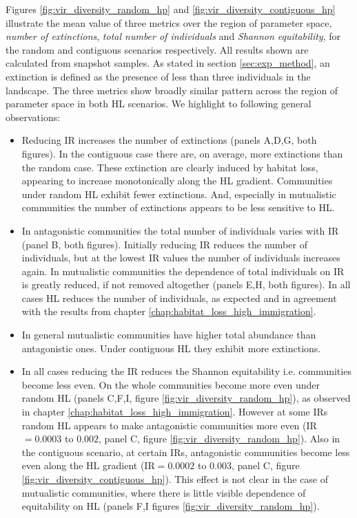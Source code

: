 Figures \ref{fig:vir_diversity_random_hp} and \ref{fig:vir_diversity_contiguous_hp} illustrate the mean value of three metrics over the region of parameter space, \emph{number of extinctions}, \emph{total number of individuals} and \emph{Shannon equitability}, for the random and contiguous scenarios respectively. All results shown are calculated from snapshot samples. As stated in section \ref{sec:exp_method}, an extinction is defined as the presence of less than three individuals in the landscape. The three metrics show broadly similar pattern across the region of parameter space in both HL scenarios. We highlight to following general observations:
\begin{itemize}
	\item Reducing IR increases the number of extinctions (panels A,D,G, both figures). In the contiguous case there are, on average, more extinctions than the random case. These extinction are clearly induced by habitat loss, appearing to increase monotonically along the HL gradient. Communities under random HL exhibit fewer extinctions. And, especially in mutualistic communities the number of extinctions appears to be less sensitive to HL.
	\item In antagonistic communities the total number of individuals varies with IR (panel B, both figures). Initially reducing IR reduces the number of individuals, but at the lowest IR values the number of individuals increases again. In mutualistic communities the dependence of total individuals on IR is greatly reduced, if not removed altogether (panels E,H, both figures). In all cases HL reduces the number of individuals, as expected and in agreement with the results from chapter \ref{chap:habitat_loss_high_immigration}.
	\item In general mutualistic communities have higher total abundance than antagonistic ones. Under contiguous HL they exhibit more extinctions.
	\item In all cases reducing the IR reduces the Shannon equitability i.e. communities become less even. On the whole communities become more even under random HL (panels C,F,I, figure \ref{fig:vir_diversity_random_hp}), as observed in chapter \ref{chap:habitat_loss_high_immigration}. However at some IRs random HL appears to make antagonistic communities more even (IR$=0.0003$ to $0.002$, panel C, figure \ref{fig:vir_diversity_random_hp}). Also in the contiguous scenario, at certain IRs, antagonistic communities become less even along the HL gradient (IR$=0.0002$ to $0.003$, panel C, figure \ref{fig:vir_diversity_contiguous_hp}). This effect is not clear in the case of mutualistic communities, where there is little visible dependence of equitability on HL (panels F,I figures \ref{fig:vir_diversity_random_hp}).
\end{itemize}

